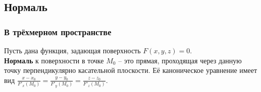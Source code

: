 \subsection{Нормаль}
\subsubsection{В трёхмерном пространстве}
Пусть дана функция, задающая поверхность $F(x,y,z) = 0$.\\
\textbf{Нормаль} к поверхности в точке $M_0$ – это прямая, проходящая через данную точку перпендикулярно касательной плоскости. Её каноническое уравнение имеет вид $\frac{x - x_0}{F'_x(M_0)} = \frac{y - y_0}{F'_y(M_0)} = \frac{z - z_0}{F'_z(M_0)}$.